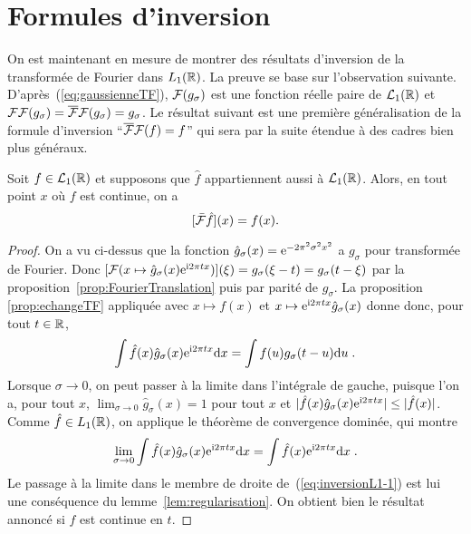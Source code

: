 \section{Formules d'inversion}

On est maintenant en mesure de montrer des r{\'e}sultats d'inversion de la
transform{\'e}e de Fourier dans $L_1(\mathbb{R})$. La preuve se base sur l'observation
suivante. D'apr{\`e}s~(\ref{eq:gaussienneTF}), $\mathcal{F}(g_\sigma)$ est une fonction
r{\'e}elle paire de $\mathcal{L}_1(\mathbb{R})$ et
$\mathcal{F}\mathcal{F}(g_\sigma)=\overline{\mathcal{F}}\mathcal{F}(g_\sigma)=g_\sigma$. Le r{\'e}sultat suivant est une
premi{\`e}re g{\'e}n{\'e}ralisation de la formule d'inversion ``$\overline{\mathcal{F}}\mathcal{F}(f)=f$'' qui sera
par la suite {\'e}tendue {\`a} des cadres bien plus g{\'e}n{\'e}raux.

\begin{proposition}\label{prop:inversionFourierL1}
Soit $f\in\mathcal{L}_1(\mathbb{R})$ et supposons que $\hat{f}$ appartiennent aussi
{\`a} $\mathcal{L}_1(\mathbb{R})$. Alors, en tout point $x$ o{\`u} $f$ est continue, on a
\begin{equation}
\label{eq:inversionFT}
[\bar{\mathcal{F}} \hat{f}](x) = f(x).
\end{equation}
\end{proposition}
\begin{proof}
On a vu ci-dessus que la fonction $\hat{g}_\sigma(x) = \mathrm{e}^{- 2 \pi^2 \sigma^2 x^2}$
a ${g}_\sigma$ pour transform{\'e}e de Fourier. Donc
$[\mathcal{F}(x\mapsto \hat{g}_\sigma(x)\mathrm{e}^{\mathrm{i} 2 \pi t x})](\xi)={g}_\sigma(\xi-t)={g}_\sigma(t-\xi)$ par la
proposition~\ref{prop:FourierTranslation} puis par parit{\'e} de $g_\sigma$. La proposition \ref{prop:echangeTF} appliqu{\'e}e avec
$x \mapsto f(x)$ et $x \mapsto \mathrm{e}^{\mathrm{i} 2 \pi t x} \hat{g}_\sigma(x)$ donne donc, pour tout $t\in \mathbb{R}$,
\begin{equation}
\label{eq:inversionL1-1}
\int \hat{f}(x) \hat{g}_\sigma(x) \mathrm{e}^{\mathrm{i} 2 \pi t x} \mathrm{d} x = \int f(u) {g}_\sigma(t-u) \mathrm{d} u  \;.
\end{equation}
Lorsque $\sigma \to 0$, on peut passer {\`a} la limite dans l'int{\'e}grale de gauche, puisque l'on a, pour tout
$x$, $\lim_{\sigma \to 0} \hat{g}_\sigma(x)= 1$ pour tout $x$ et $|\hat{f}(x) \hat{g}_\sigma(x) \mathrm{e}^{\mathrm{i} 2 \pi t x}| \leq |\hat{f}(x)|$.
Comme $\hat{f} \in L_1(\mathbb{R})$, on applique le th{\'e}or{\`e}me de convergence domin{\'e}e, qui montre
$$
\lim_{\sigma \to 0} \int \hat{f}(x) \hat{g}_\sigma(x) \mathrm{e}^{ \mathrm{i} 2 \pi t x} \mathrm{d} x = \int \hat{f}(x) \mathrm{e}^{\mathrm{i} 2 \pi t x} \mathrm{d} x \;.
$$
Le passage {\`a} la limite dans le membre de droite de~(\ref{eq:inversionL1-1}) est lui une cons{\'e}quence du
lemme~\ref{lem:regularisation}. On obtient bien le r{\'e}sultat annonc{\'e} si $f$ est continue en $t$.
\end{proof}

